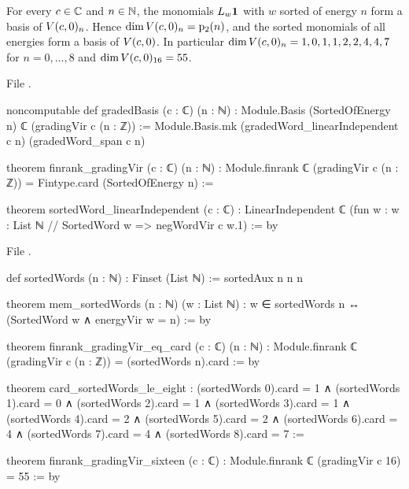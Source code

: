 \begin{theorem}\label{l06:thm:pbw}
For every $c\in{\mathbb{C}}$ and $n\in{\mathbb{N}}$, the monomials $L_w\mathbf{1}$ with $w$ sorted of energy $n$ form a
basis of $V(c,0)_n$. Hence $\dim V(c,0)_n = \mathrm{p}_{2}(n)$, and the sorted monomials of all energies form a
basis of $V(c,0)$. In particular $\dim V(c,0)_n = 1,0,1,1,2,2,4,4,7$ for $n = 0,\dots,8$ and
$\dim V(c,0)_{16} = 55$.
\end{theorem}

File .
\begin{leancode}
noncomputable def gradedBasis (c : ℂ) (n : ℕ) : Module.Basis (SortedOfEnergy n) ℂ
    (gradingVir c (n : ℤ)) :=
  Module.Basis.mk (gradedWord_linearIndependent c n) (gradedWord_span c n)

theorem finrank_gradingVir (c : ℂ) (n : ℕ) :
    Module.finrank ℂ (gradingVir c (n : ℤ)) = Fintype.card (SortedOfEnergy n) :=

theorem sortedWord_linearIndependent (c : ℂ) :
    LinearIndependent ℂ (fun w : {w : List ℕ // SortedWord w} => negWordVir c w.1) := by
\end{leancode}
File .
\begin{leancode}
def sortedWords (n : ℕ) : Finset (List ℕ) := sortedAux n n n

theorem mem_sortedWords (n : ℕ) (w : List ℕ) :
    w ∈ sortedWords n ↔ (SortedWord w ∧ energyVir w = n) := by

theorem finrank_gradingVir_eq_card (c : ℂ) (n : ℕ) :
    Module.finrank ℂ (gradingVir c (n : ℤ)) = (sortedWords n).card := by

theorem card_sortedWords_le_eight :
    (sortedWords 0).card = 1 ∧ (sortedWords 1).card = 0 ∧ (sortedWords 2).card = 1 ∧
      (sortedWords 3).card = 1 ∧ (sortedWords 4).card = 2 ∧ (sortedWords 5).card = 2 ∧
      (sortedWords 6).card = 4 ∧ (sortedWords 7).card = 4 ∧ (sortedWords 8).card = 7 :=

theorem finrank_gradingVir_sixteen (c : ℂ) : Module.finrank ℂ (gradingVir c 16) = 55 := by
\end{leancode}

